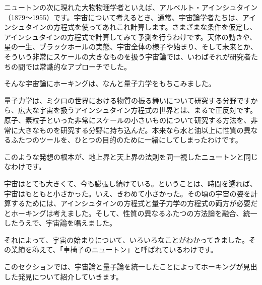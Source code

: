 \documentclass[10pt,b5paper,papersize,dvipdfmx]{jsbook}
\begin{document}
\newpage

ニュートンの次に現れた大物物理学者といえば、アルベルト・アインシュタイン（1879～1955）です。宇宙について考えるとき、通常、宇宙論学者たちは、アインシュタインの方程式を使ってあれこれ計算します。さまざまな条件を仮定し、アインシュタインの方程式で計算してみて予測を行うわけです。天体の動きや、星の一生、ブラックホールの実態、宇宙全体の様子や始まり、そして未来とか、そういう非常にスケールの大きなものを扱う宇宙論では、いわばそれが研究者たちの間では常識的なアプローチでした。\par
そんな宇宙論にホーキングは、なんと量子力学をもちこみました。\par
量子力学は、ミクロの世界における物質の振る舞いについて研究する分野ですから、広大な宇宙を扱うアインシュタイン方程式の世界とは、まるで正反対です。原子、素粒子といった非常にスケールの小さいものについて研究する方法を、非常に大きなものを研究する分野に持ち込んだ。本来なら水と油以上に性質の異なるふたつのツールを、ひとつの目的のために一緒にしてしまったわけです。\par
このような発想の根本が、地上界と天上界の法則を同一視したニュートンと同じなわけです。\par
宇宙はとても大きくて、今も膨張し続けている。ということは、時間を遡れば、宇宙はもともと小さかった。いえ、きわめて小さかった。その頃の宇宙の姿を計算するためには、アインシュタインの方程式と量子力学の方程式の両方が必要だとホーキングは考えました。そして、性質の異なるふたつの方法論を融合、統一したうえで、宇宙論を唱えました。\par
それによって、宇宙の始まりについて、いろいろなことがわかってきました。その業績を称えて、「車椅子のニュートン」と呼ばれているわけです。\par
このセクションでは、宇宙論と量子論を統一したことによってホーキングが見出した発見について紹介していきます。\par
 
\end{document}
